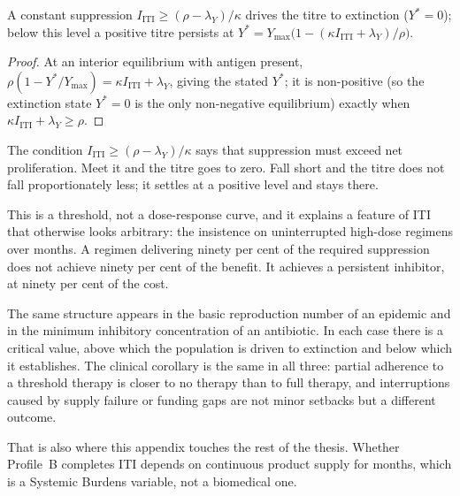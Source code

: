 \begin{proposition}
\label{prop:C_iti}
A constant suppression $I_{\text{ITI}}\ge(\rho-\lambda_Y)/\kappa$ drives the
titre to extinction ($Y^\ast=0$); below this level a positive titre persists at
$Y^\ast=Y_{\max}\big(1-(\kappa I_{\text{ITI}}+\lambda_Y)/\rho\big)$.
\end{proposition}
\begin{proof}
At an interior equilibrium with antigen present,
$\rho(1-Y^\ast/Y_{\max})=\kappa I_{\text{ITI}}+\lambda_Y$, giving the stated
$Y^\ast$; it is non-positive (so the extinction state $Y^\ast=0$ is the only
non-negative equilibrium) exactly when $\kappa I_{\text{ITI}}+\lambda_Y\ge\rho$.
\end{proof}

\begin{reading}
The condition $I_{\text{ITI}}\ge(\rho-\lambda_Y)/\kappa$ says that suppression
must exceed net proliferation. Meet it and the titre goes to zero. Fall short
and the titre does not fall proportionately less; it settles at a positive
level and stays there.

This is a threshold, not a dose-response curve, and it explains a feature of
ITI that otherwise looks arbitrary: the insistence on uninterrupted high-dose
regimens over months. A regimen delivering ninety per cent of the required
suppression does not achieve ninety per cent of the benefit. It achieves a
persistent inhibitor, at ninety per cent of the cost.

The same structure appears in the basic reproduction number of an epidemic and
in the minimum inhibitory concentration of an antibiotic. In each case there is
a critical value, above which the population is driven to extinction and below
which it establishes. The clinical corollary is the same in all three: partial
adherence to a threshold therapy is closer to no therapy than to full therapy,
and interruptions caused by supply failure or funding gaps are not minor
setbacks but a different outcome.

That is also where this appendix touches the rest of the thesis. Whether Profile~B
completes ITI depends on continuous product supply for months, which is a
Systemic Burdens variable, not a biomedical one.
\end{reading}

